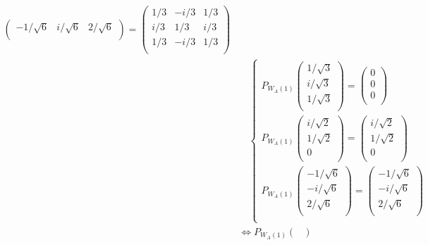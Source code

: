 \documentclass[dvipdfmx]{jsarticle}
\begin{document}
\begin{align*}
\begin{pmatrix}
 - {1}/{\sqrt{6}} & {i}/{\sqrt{6}} & {2}/{\sqrt{6}} \\
\end{pmatrix} = \begin{pmatrix}
{1}/{3} & - {i}/{3} & {1}/{3} \\
{i}/{3} & {1}/{3} & {i}/{3} \\
{1}/{3} & - {i}/{3} & {1}/{3} \\
\end{pmatrix}\\
&\quad \left\{ \begin{matrix}
P_{W_{A}(1)}\begin{pmatrix}
{1}/{\sqrt{3}} \\
{i}/{\sqrt{3}} \\
{1}/{\sqrt{3}} \\
\end{pmatrix} = \begin{pmatrix}
0 \\
0 \\
0 \\
\end{pmatrix} \\
P_{W_{A}(1)}\begin{pmatrix}
{i}/{\sqrt{2}} \\
{1}/{\sqrt{2}} \\
0 \\
\end{pmatrix} = \begin{pmatrix}
{i}/{\sqrt{2}} \\
{1}/{\sqrt{2}} \\
0 \\
\end{pmatrix} \\
P_{W_{A}(1)}\begin{pmatrix}
 - {1}/{\sqrt{6}} \\
 - {i}/{\sqrt{6}} \\
{2}/{\sqrt{6}} \\
\end{pmatrix} = \begin{pmatrix}
 - {1}/{\sqrt{6}} \\
 - {i}/{\sqrt{6}} \\
{2}/{\sqrt{6}} \\
\end{pmatrix} \\
\end{matrix} \right.\ \\
&\Leftrightarrow P_{W_{A}(1)}\begin{pmatrix}

\end{pmatrix}
\end{align*}
\end{document}
